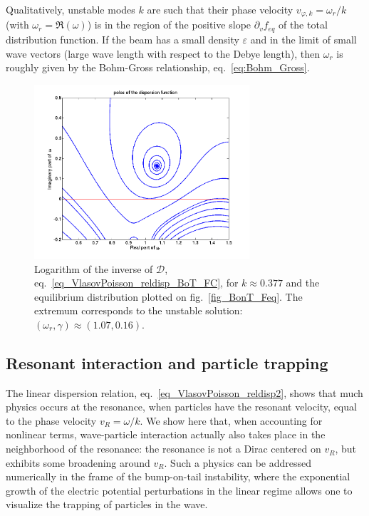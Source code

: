 \documentclass[11pt]{article}
\begin{document}
Qualitatively, unstable modes $k$ are such that their phase velocity $v_{\varphi,k} = \omega_r/k$ (with $\omega_r =\Re({\omega})$) is in the region of the positive slope $\partial_v f_{eq}$ of the total distribution function. If the beam has a small density $\varepsilon$ and in the limit of small wave vectors (large wave length with respect to the Debye length), then $\omega_r$ is roughly given by the Bohm-Gross relationship, eq.~\eqref{eq:Bohm_Gross}.

\begin{figure}[!h]
	\begin{center}
		\includegraphics[width=8cm]{Figures/Fig_BoT_DispRel.png}
		\caption{Logarithm of the inverse of $\mathcal{D}$, eq.~\eqref{eq_VlasovPoisson_reldisp_BoT_FC}, for $k\approx 0.377$ and the equilibrium distribution plotted on fig.~\ref{fig_BonT_Feq}. The extremum corresponds to the unstable solution: $(\omega_r,\gamma) \approx (1.07, 0.16)$.} \label{fig_BoT_DispRel}
	\end{center}
\end{figure}

\subsection{Resonant interaction and particle trapping}

The linear dispersion relation, eq.~\eqref{eq_VlasovPoisson_reldisp2}, shows that much physics occurs at the resonance, when particles have the resonant velocity, equal to the phase velocity $v_R=\omega/k$. We show here that, when accounting for nonlinear terms, wave-particle interaction actually also takes place in the neighborhood of the resonance: the resonance is not a Dirac centered on $v_R$, but exhibits some broadening around $v_R$. Such a physics can be addressed numerically in the frame of the bump-on-tail instability, where the exponential growth of the electric potential perturbations in the linear regime allows one to visualize the trapping of particles in the wave. \\
\end{document}

